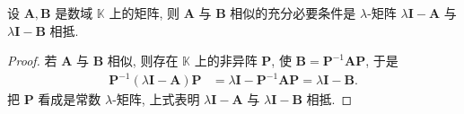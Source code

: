 \documentclass[../../main.tex]{subfiles}
\begin{document}
\begin{theorem}\label{theorem:矩阵相似的充要条件是对应的lamda-矩阵相抵}
设 $\boldsymbol{A},\boldsymbol{B}$ 是数域 $\mathbb{K}$ 上的矩阵, 则 $\boldsymbol{A}$ 与 $\boldsymbol{B}$ 相似的充分必要条件是 $\lambda$-矩阵 $\lambda\boldsymbol{I}-\boldsymbol{A}$ 与 $\lambda\boldsymbol{I}-\boldsymbol{B}$ 相抵.
\end{theorem}
\begin{proof}
若 $\boldsymbol{A}$ 与 $\boldsymbol{B}$ 相似, 则存在 $\mathbb{K}$ 上的非异阵 $\boldsymbol{P}$, 使 $\boldsymbol{B}=\boldsymbol{P}^{-1}\boldsymbol{A}\boldsymbol{P}$, 于是
\begin{align*}
\boldsymbol{P}^{-1}(\lambda\boldsymbol{I}-\boldsymbol{A})\boldsymbol{P}&=\lambda\boldsymbol{I}-\boldsymbol{P}^{-1}\boldsymbol{A}\boldsymbol{P}=\lambda\boldsymbol{I}-\boldsymbol{B}. 
\end{align*}
把 $\boldsymbol{P}$ 看成是常数 $\lambda$-矩阵, 上式表明 $\lambda\boldsymbol{I}-\boldsymbol{A}$ 与 $\lambda\boldsymbol{I}-\boldsymbol{B}$ 相抵.


\end{proof}
\end{document}
